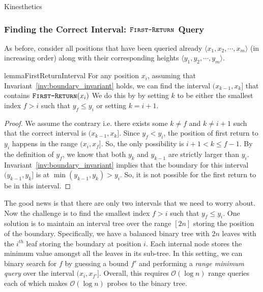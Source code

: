\begin{theorem}
\label{thm:first_return_in_interval}
Kinesthetics
\end{theorem}



\subsubsection{Finding the Correct Interval: $\texttt{\textsc{First-Return}}$ Query}
As before, consider all positions that have been queried already $ \langle x_1, x_2,\cdots, x_m \rangle$ (in increasing order)
along with their corresponding heights $ \langle y_1, y_2,\cdots, y_m \rangle$.
\begin{restatable}{lemma}{FirstReturnInterval}
\label{lem:first_return_interval}
For any position $x_i$, assuming that Invariant~\ref{inv:boundary_invariant} holds,
we can find the interval $(x_{k-1},x_{k}]$ that contains $\texttt{\textsc{First-Return}}(x_i)$
We do this by by setting $k$ to be either the smallest index $f>i$ such that $y_f\le y_i$ or setting $k=i+1$.
\end{restatable}
\begin{proof}
We assume the contrary i.e. there exists some $k\not=f$ and $k\not=i+1$ such that the correct interval is $(x_{k-1},x_k]$.
Since $y_f<y_i$, the position of first return to $y_i$ happens in the range $(x_i,x_f]$.
So, the only possibility is $i+1 < k \le f-1$.
By the definition of $y_f$, we know that both $y_k$ and $y_{k-1}$ are strictly larger than $y_i$.
Invariant~\ref{inv:boundary_invariant} implies that the boundary for this interval $(y_{k-1},y_k]$ is at $\min(y_{k-1},y_k) > y_i$.
So, it is not possible for the first return to be in this interval.
\end{proof}

The good news is that there are only two intervals that we need to worry about.
Now the challenge is to find the smallest index $f>i$ such that $y_f\le y_i$.
One solution is to maintain an interval tree  over the range $[2n]$ storing the position of the boundary.
Specifically, we have a balanced binary tree with $2n$ leaves with the $i^{th}$ leaf storing the boundary at position $i$.
Each internal node stores the minimum value amongst all the leaves in its sub-tree.
In this setting, we can binary search for $f$ by guessing a bound $f'$ and performing a \emph{range minimum query} over the interval $(x_i,x_{f'}]$.
Overall, this requires $\mathcal O(\log n)$ range queries each of which makes $\mathcal O(\log n)$ probes to the binary tree.

